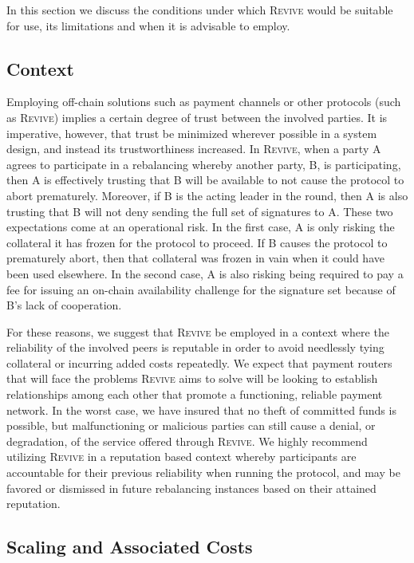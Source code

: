 \documentclass[sigconf]{acmart}
\newcommand{\name}{\textsc{Revive}\xspace}
\begin{document}
In this section we discuss the conditions under which \name would be suitable for use, its limitations and when it is advisable to employ.

\subsection{Context}

Employing off-chain solutions such as payment channels or other protocols (such as \name) implies a certain degree of trust between the involved parties. It is imperative, however, that trust be minimized wherever possible in a system design, and instead its trustworthiness increased.
In \name, when a party A agrees to participate in a rebalancing whereby another party, B, is participating, then A is effectively trusting that B will be available to not cause the protocol to abort prematurely. Moreover, if B is the acting leader in the round, then A is also trusting that B will not deny sending the full set of signatures to A.
These two expectations come at an operational risk. In the first case, A is only risking the collateral it has frozen for the protocol to proceed. If B causes the protocol to prematurely abort, then that collateral was frozen in vain when it could have been used elsewhere. In the second case, A is also risking being required to pay a fee for issuing an on-chain availability challenge for the signature set because of B's lack of cooperation.

For these reasons, we suggest that \name be employed in a context where the reliability of the involved peers is reputable in order to avoid needlessly tying collateral or incurring added costs repeatedly. We expect that payment routers that will face the problems \name aims to solve will be looking to establish relationships among each other that promote a functioning, reliable payment network. In the worst case, we have insured that no theft of committed funds is possible, but malfunctioning or malicious parties can still cause a denial, or degradation, of the service offered through \name.
We highly recommend utilizing \name in a reputation based context whereby participants are accountable for their previous reliability when running the protocol, and may be favored or dismissed in future rebalancing instances based on their attained reputation.

\subsection{Scaling and Associated Costs}
\end{document}
